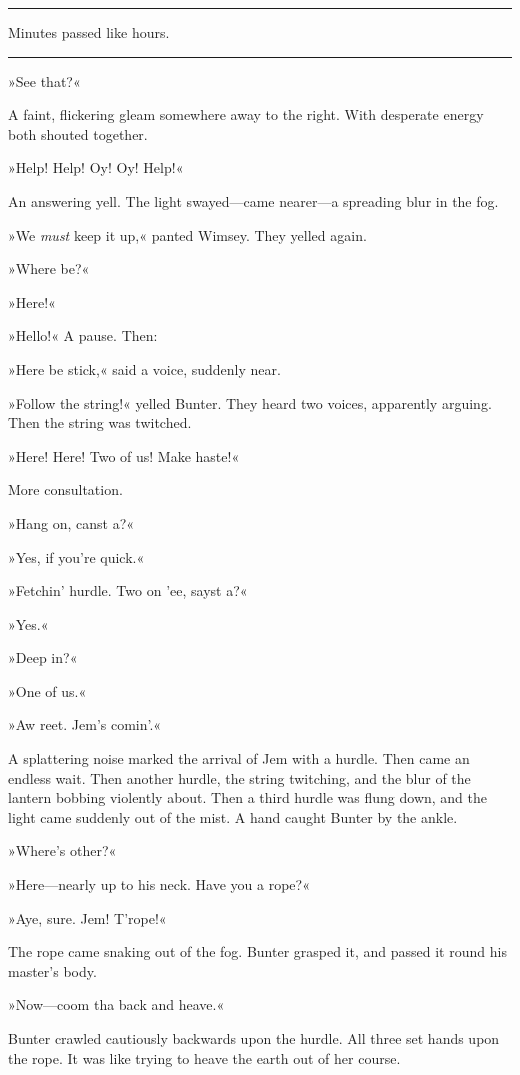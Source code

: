 \noindent\hfil\rule{0.5\textwidth}{.4pt}\hfil 

Minutes passed like hours. 

\noindent\hfil\rule{0.5\textwidth}{.4pt}\hfil 

»See that?«

A faint, flickering gleam somewhere away to the right. With desperate energy both shouted together.

»Help! Help! Oy! Oy! Help!«

An answering yell. The light swayed—came nearer—a spreading blur in the fog.

»We \textit{must} keep it up,« panted Wimsey. They yelled again.

»Where be?«

»Here!«

»Hello!« A pause. Then:

»Here be stick,« said a voice, suddenly near.

»Follow the string!« yelled Bunter. They heard two voices, apparently arguing. Then the string was twitched.

»Here! Here! Two of us! Make haste!«

More consultation.

»Hang on, canst a?«

»Yes, if you're quick.«

»Fetchin' hurdle. Two on 'ee, sayst a?«

»Yes.«

»Deep in?«

»One of us.«

»Aw reet. Jem's comin'.«

A splattering noise marked the arrival of Jem with a hurdle. Then came an endless wait. Then another hurdle, the string twitching, and the blur of the lantern bobbing violently about. Then a third hurdle was flung down, and the light came suddenly out of the mist. A hand caught Bunter by the ankle.

»Where's other?«

»Here—nearly up to his neck. Have you a rope?«

»Aye, sure. Jem! T'rope!«

The rope came snaking out of the fog. Bunter grasped it, and passed it round his master's body.

»Now—coom tha back and heave.«

Bunter crawled cautiously backwards upon the hurdle. All three set hands upon the rope. It was like trying to heave the earth out of her course.

